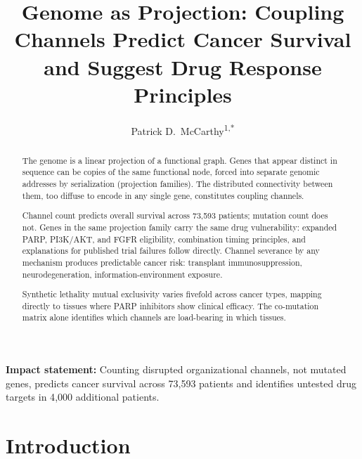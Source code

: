 \documentclass[11pt]{article}
\title{Genome as Projection: Coupling Channels Predict Cancer Survival
and Suggest Drug Response Principles}
\author{Patrick D.\ McCarthy\textsuperscript{1,*}}
\date{}
\begin{document}
\maketitle


\noindent\textbf{Impact statement:}
Counting disrupted organizational channels, not mutated genes,
predicts cancer survival across 73{,}593 patients and identifies
untested drug targets in 4{,}000 additional patients.


\begin{abstract}
The genome is a linear projection of a functional graph. Genes that
appear distinct in sequence can be copies of the same functional
node, forced into separate genomic addresses by serialization
(projection families). The distributed connectivity between them,
too diffuse to encode in any single gene, constitutes coupling
channels.

Channel count predicts overall survival across 73{,}593 patients;
mutation count does not. Genes in the same projection family carry
the same drug vulnerability: expanded PARP, PI3K/AKT, and FGFR
eligibility, combination timing principles, and explanations for
published trial failures follow directly. Channel severance by any
mechanism produces predictable cancer risk: transplant
immunosuppression, neurodegeneration, information-environment
exposure.

Synthetic lethality mutual exclusivity varies fivefold across cancer
types, mapping directly to tissues where PARP inhibitors show
clinical efficacy. The co-mutation matrix alone identifies which
channels are load-bearing in which tissues.
\end{abstract}


\section*{Introduction}
\end{document}
